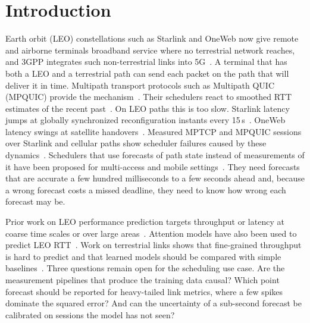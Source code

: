 \section{Introduction}
 Earth orbit (LEO) constellations such as Starlink and OneWeb now give remote and airborne terminals broadband service where no terrestrial network reaches, and 3GPP integrates such non-terrestrial links into 5G~\cite{lin20215g}. A terminal that has both a LEO and a terrestrial path can send each packet on the path that will deliver it in time. Multipath transport protocols such as Multipath QUIC (MPQUIC) provide the mechanism~\cite{deconinck2017multipath}. Their schedulers react to smoothed RTT estimates of the recent past~\cite{paasch2014experimental,lim2017ecf}. On LEO paths this is too slow. Starlink latency jumps at globally synchronized reconfiguration instants every 15\,s~\cite{mohan2024multifaceted,tanveer2023making}. OneWeb latency swings at satellite handovers~\cite{zhao2025measuring}. Measured MPTCP and MPQUIC sessions over Starlink and cellular paths show scheduler failures caused by these dynamics~\cite{baltaci2023multipath}. Schedulers that use forecasts of path state instead of measurements of it have been proposed for multi-access and mobile settings~\cite{yang2024mams,maglione2025intelligent}. They need forecasts that are accurate a few hundred milliseconds to a few seconds ahead and, because a wrong forecast costs a missed deadline, they need to know how wrong each forecast may be.

Prior work on LEO performance prediction targets throughput or latency at coarse time scales or over large areas~\cite{liu2025vivisecting,benghe2026horizon}. Attention models have also been used to predict LEO RTT~\cite{tian2025attention}. Work on terrestrial links shows that fine-grained throughput is hard to predict and that learned models should be compared with simple baselines~\cite{basit2024predictability,raca2020leveraging}. Three questions remain open for the scheduling use case. Are the measurement pipelines that produce the training data causal? Which point forecast should be reported for heavy-tailed link metrics, where a few spikes dominate the squared error? And can the uncertainty of a sub-second forecast be calibrated on sessions the model has not seen?

